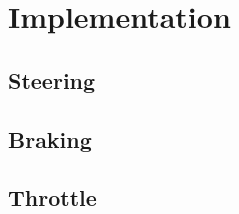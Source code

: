 
\chapter{Implementation}
\label{chp:Implementation}

\section{Steering}

\section{Braking}

\section{Throttle}